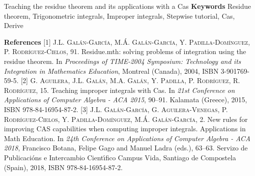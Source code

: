 \begin{abstract_online}{Teaching the residue theorem and its applications with a {\sc Cas}}
\textbf{Keywords} \newline{} Residue theorem, Trigonometric integrals, Improper integrals, Stepwise tutorial, {\sc Cas}, {\sc Derive}

\textbf{References} \newline{}
[1] \textsc{J.L. Gal\'an-Garc\'{\i}a, M.\'A. Gal\'an-Garc\'{\i}a, Y. Padilla-Dom\'{\i}nguez, P. Rodr\'{\i}guez-Cielos}, 91.	Residue.mth: solving problems of integration using the residue theorem. In \emph{Proceedings of TIME-2004 Symposium: Technology and its Integration in Mathematics Education}, Montreal (Canada), 2004, ISBN 3-901769-59-5. \newline{}
[2] \textsc{G. Aguilera, J.L. Galán, M.A. Galán, Y. Padilla, P. Rodríguez, R. Rodríguez}, 15.	Teaching improper integrals with {\sc Cas}. In \emph{21st Conference on Applications of Computer Algebra - ACA 2015}, 90--91. Kalamata (Greece), 2015, ISBN 978-84-16954-87-2. \newline{}
[3] \textsc{J.L. Gal\'an-Garc\'{\i}a, G. Aguilera-Venegas, P. Rodr\'{\i}guez-Cielos, Y. Padilla-Dom\'{\i}nguez, M.\'A. Gal\'an-Garc\'{\i}a}, 2.	New rules for improving CAS capabilities when computing improper integrals. Applications in Math Education. In \emph{24th Conference on Applications of Computer Algebra - ACA 2018}, Francisco Botana, Felipe Gago and Manuel Ladra (eds.), 63--63. Servizo de Publicaci\'ons e Intercambio Cient\'{\i}fico Campus Vida, Santiago de Compostela (Spain), 2018, ISBN 978-84-16954-87-2. \newline{}
\end{abstract_online}
    